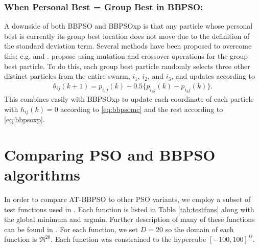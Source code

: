 \documentclass[cmbright]{staauth}
\begin{document}
\subsubsection{When Personal Best = Group Best in BBPSO:}
A downside of both BBPSO and BBPSOxp is that any particle whose personal best is currently its group best location does not move due to the definition of the standard deviation term. Several methods have been proposed to overcome this; e.g. \citet{hsieh2010modified} and \citet{zhang2011novel}. \citet{zhang2011novel} propose using mutation and crossover operations for the group best particle. To do this, each group best particle randomly selects three other distinct particles from the entire swarm, $i_1$, $i_2$, and $i_3$, and updates according to
\begin{align}\label{eq:bbpsomc}
\theta_{ij}(k+1) = p_{i_1j}(k) + 0.5\{p_{i_2j}(k) - p_{i_3j}(k)\}.
\end{align}
This combines easily with BBPSOxp to update each coordinate of each particle with $h_{ij}(k)=0$ according to \eqref{eq:bbpsomc} and the rest according to \eqref{eq:bbpsoxp}.

\section{Comparing PSO and BBPSO algorithms}\label{app:psocompare}

In order to compare AT-BBPSO to other PSO variants, we employ a subset of test functions used in \citet{hsieh2010modified}. Each function is listed in Table \ref{tab:testfuns} along with the global minimum and argmin. Further description of many of these functions can be found in \citet{clerc2010particle}. For each function, we set $D=20$ so the domain of each function is $\Re^{20}$. Each function was constrained to the hypercube $[-100, 100]^D$.
\end{document}
